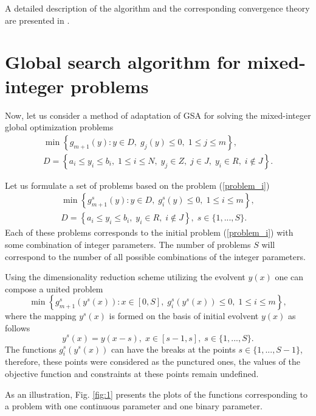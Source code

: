 \documentclass{llncs}
\begin{document}

A detailed description 
of the algorithm and the corresponding convergence theory are presented in 
\cite{Strongin2000}.

\section{Global search algorithm for mixed-integer problems}

Now, let us consider a method of adaptation of GSA for solving the mixed-integer global 
optimization problems 
\begin{gather}\label{problem_i}
\min{\left\{ g_{m+1}(y):y\in D, \; g_j(y)\leq 0, \; 1 \leq j \leq m\right\}},\\
D=\left\{a_i\leq y_i \leq b_i, \; 1\leq i \leq N, \; y_j \in Z, \; j \in J, \; y_i \in R, \; i \notin J \right\}.\nonumber
\end{gather}

Let us formulate a set of problems based on the problem (\ref{problem_i})
\begin{gather}\label{problem_is}
\min{\left\{ g_{m+1}^s(y):y\in D, \; g_i^s(y)\leq 0, \; 1 \leq i \leq m\right\}},\\
D=\left\{ a_i\leq y_i \leq b_i, \;  y_i \in R, \; i \notin J \right\}, \; s\in\{1,...,S\}.\nonumber 
\end{gather}
Each of these problems corresponds to the initial problem (\ref{problem_i}) with some combination of 
integer parameters. The number of problems $S$ will correspond to the number of all possible 
combinations of the integer parameters.

Using the dimensionality reduction scheme utilizing the evolvent $y(x)$ 
one can compose a united problem 
\begin{equation}\label{problem_is1}
\min \left\{g_{m+1}^s(y^s(x)): x \in [0,S], \; g_i^s(y^s(x)) \leq 0, \; 1 \leq i \leq m\right\},
\end{equation}
where the mapping $y^s(x)$ is formed on the basis of initial evolvent $y(x)$ as follows
\[
y^s(x)=y(x-s), \; x\in[s-1,s],\; s\in\{1,...,S\}.
\]
The functions $g_i^s(y^s(x))$ can have the breaks at the points $s\in \{1,...,S-1\}$, therefore, 
these points were considered as the punctured ones, the values of the objective function and 
constraints at these points remain undefined.

As an illustration, Fig. \ref{fig:1} presents the plots of the functions corresponding to a 
problem with one continuous parameter and one binary parameter.
\end{document}
